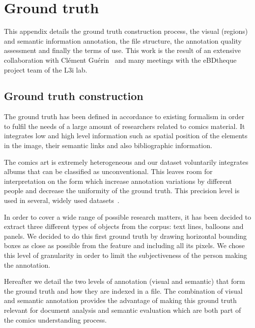 \chapter{Ground truth}
\label{app:groundtruth}
\graphicspath{{./chapters/Appendix/figs/}}

This appendix details the ground truth construction process, the visual (regions) and semantic information annotation, the file structure, the annotation quality assessment and finally the terms of use.
This work is the result of an extensive collaboration with Cl{\'e}ment Gu{\'e}rin~\cite{phdthesisGuerin14} and many meetings with the eBDtheque project team of the L3i lab.


\section{Ground truth construction} %
\label{sec:ground_truth_construction}

The ground truth has been defined in accordance to existing formalism in order to fulfil the needs of a large amount of researchers related to comics material.
It integrates low and high level information such as spatial position of the elements in the image, their semantic links and also bibliographic information.


The comics art is extremely heterogeneous and our dataset voluntarily integrates albums that can be classified as
unconventional.
This leaves room for interpretation on the form which increase annotation variations by different people and decrease the uniformity of the ground truth.
This precision level is used in several, widely used datasets~\cite{pascal-voc-2012, yao2007introduction}.

In order to cover a wide range of possible research matters, it has been decided to extract three different types of objects from the corpus: text lines, balloons and panels.
We decided to do this first ground truth by drawing horizontal bounding boxes as close as possible from the feature and including all its pixels.
We chose this level of granularity in order to limit the subjectiveness of the person making the annotation.

Hereafter we detail the two levels of annotation (visual and semantic) that form the ground truth and how they are indexed in a file.
The combination of visual and semantic annotation provides the advantage of making this ground truth relevant for document analysis and semantic evaluation which are both part of the comics understanding process.

